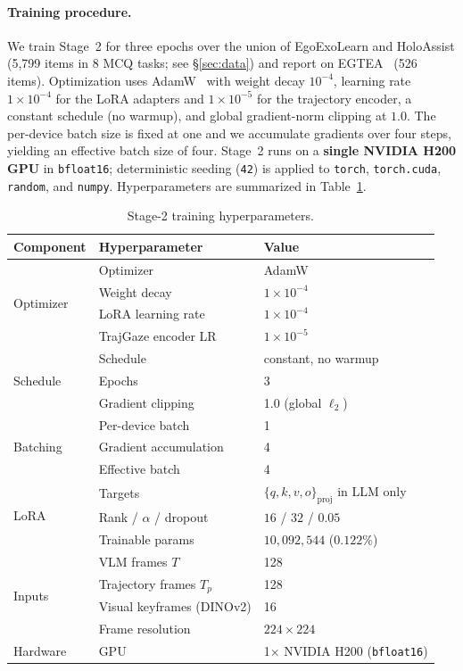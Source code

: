 \paragraph{Training procedure.}
We train Stage~2 for three epochs over the union of EgoExoLearn and
HoloAssist (5{,}799 items in 8 MCQ tasks; see \S\ref{sec:data}) and report
on EGTEA~\citep{li2018egtea} (526 items). Optimization uses
AdamW~\citep{loshchilov2019adamw} with weight decay $10^{-4}$, learning
rate $1{\times}10^{-4}$ for the LoRA adapters and $1{\times}10^{-5}$ for
the trajectory encoder, a constant schedule (no warmup), and global
gradient-norm clipping at $1.0$. The per-device batch size is fixed at one
and we accumulate gradients over four steps, yielding an effective batch
size of four. Stage~2 runs on a \textbf{single NVIDIA H200 GPU} in
\texttt{bfloat16}; deterministic seeding (\texttt{42}) is applied to
\texttt{torch}, \texttt{torch.cuda}, \texttt{random}, and \texttt{numpy}.
Hyperparameters are summarized in Table~\ref{tab:hparams}.

\begin{table}[t]
  \centering
  \small
  \caption{Stage-2 training hyperparameters.}
  \label{tab:hparams}
  \begin{tabular}{lll}
    \toprule
    Component & Hyperparameter & Value \\
    \midrule
    \multirow{4}{*}{Optimizer}
      & Optimizer            & AdamW \\
      & Weight decay         & $1\times10^{-4}$ \\
      & LoRA learning rate   & $1\times10^{-4}$ \\
      & TrajGaze encoder LR  & $1\times10^{-5}$ \\
    \midrule
    \multirow{3}{*}{Schedule}
      & Schedule             & constant, no warmup \\
      & Epochs               & 3 \\
      & Gradient clipping    & 1.0 (global $\ell_2$) \\
    \midrule
    \multirow{3}{*}{Batching}
      & Per-device batch     & 1 \\
      & Gradient accumulation & 4 \\
      & Effective batch      & 4 \\
    \midrule
    \multirow{3}{*}{LoRA}
      & Targets              & $\{q,k,v,o\}_\text{proj}$ in LLM only \\
      & Rank / $\alpha$ / dropout & $16$ / $32$ / $0.05$ \\
      & Trainable params     & $10{,}092{,}544$ ($0.122\%$) \\
    \midrule
    \multirow{4}{*}{Inputs}
      & VLM frames $T$              & 128 \\
      & Trajectory frames $T_p$     & 128 \\
      & Visual keyframes (DINOv2)   & 16 \\
      & Frame resolution            & $224\times224$ \\
    \midrule
    Hardware & GPU & 1$\times$ NVIDIA H200 (\texttt{bfloat16}) \\
    \bottomrule
  \end{tabular}
\end{table}

